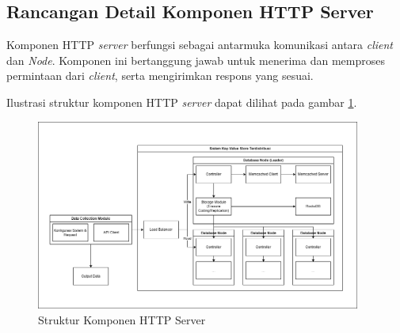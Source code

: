 \subsection{Rancangan Detail Komponen HTTP Server}
\label{subsection:detail-komponen-HTTP-server}

Komponen HTTP \textit{server} berfungsi sebagai antarmuka komunikasi antara \textit{client} dan \textit{Node}. Komponen ini bertanggung jawab untuk menerima dan memproses permintaan dari \textit{client}, serta mengirimkan respons yang sesuai.

Ilustrasi struktur komponen HTTP \textit{server} dapat dilihat pada gambar \ref{fig:http-server-structure}.

\begin{figure}[ht]
    \centering
    \includegraphics[width=0.95\textwidth]{resources/chapter-3/general-architecture.png}
    \caption{Struktur Komponen HTTP Server}
    \label{fig:http-server-structure}
\end{figure}
